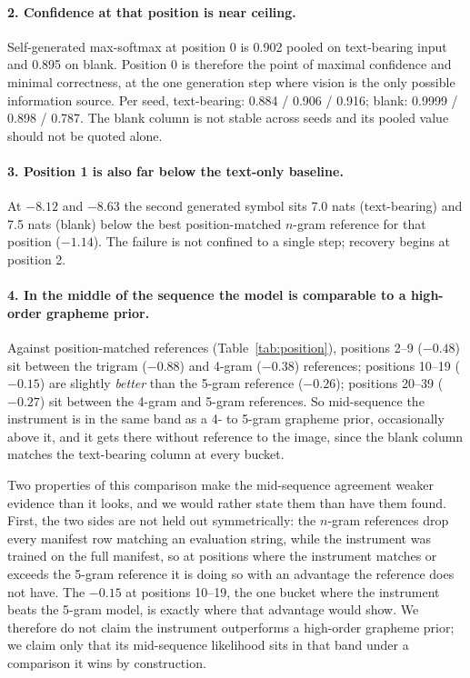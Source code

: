 \documentclass{article}
\begin{document}
\paragraph{2. Confidence at that position is near ceiling.} Self-generated max-softmax at
position 0 is 0.902 pooled on text-bearing input and 0.895 on blank. Position 0 is therefore the point
of maximal confidence and minimal correctness, at the one generation step where vision is the
only possible information source. Per seed, text-bearing: 0.884 / 0.906 / 0.916; blank: 0.9999 / 0.898
/ 0.787. The blank column is not stable across seeds and its pooled value should not be quoted
alone.

\paragraph{3. Position 1 is also far below the text-only baseline.} At $-8.12$ and $-8.63$ the
second generated symbol sits 7.0 nats (text-bearing) and 7.5 nats (blank) below the best
position-matched $n$-gram reference for that position ($-1.14$). The failure is not confined to
a single step; recovery begins at position 2.

\paragraph{4. In the middle of the sequence the model is comparable to a high-order grapheme
prior.} Against position-matched references (Table~\ref{tab:position}), positions 2--9
($-0.48$) sit between the trigram ($-0.88$) and 4-gram ($-0.38$) references; positions 10--19
($-0.15$) are slightly \emph{better} than the 5-gram reference ($-0.26$); positions 20--39
($-0.27$) sit between the 4-gram and 5-gram references. So mid-sequence the instrument is in
the same band as a 4- to 5-gram grapheme prior, occasionally above it, and it gets there
without reference to the image, since the blank column matches the text-bearing column at every bucket.

Two properties of this comparison make the mid-sequence agreement weaker evidence than it
looks, and we would rather state them than have them found. First, the two sides are not held
out symmetrically: the $n$-gram references drop every manifest row matching an evaluation
string, while the instrument was trained on the full manifest, so at positions where the
instrument matches or exceeds the 5-gram reference it is doing so with an advantage the
reference does not have. The $-0.15$ at positions 10--19, the one bucket where the instrument
beats the 5-gram model, is exactly where that advantage would show. We therefore do not claim
the instrument outperforms a high-order grapheme prior; we claim only that its mid-sequence
likelihood sits in that band under a comparison it wins by construction.
\end{document}
